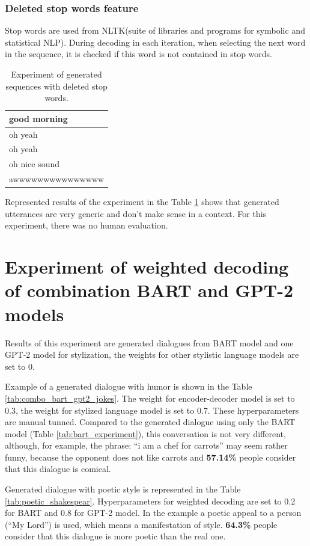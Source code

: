 \subsubsection{Deleted stop words feature}
Stop words are used from NLTK\protect\footnotemark (suite of libraries and programs for symbolic and statistical NLP). During decoding in each iteration, when selecting the next word in the sequence, it is checked if this word is not contained in stop words.

\begin{table}[ht]
\centering
 \begin{tabular}{|p{14cm}|} 
 \hline\hline
  good morning \\
 \hline
  oh yeah \\
 \hline
  oh yeah \\
 \hline
  oh nice sound \\
 \hline 
  awwwwwwwwwwwwwww \\
 \hline\hline
 \end{tabular}
 \caption{Experiment of generated sequences with deleted stop words.}
\label{tab:stop_words}
\end{table}
Represented results of the experiment in the Table \ref{tab:stop_words} shows that generated utterances are very generic and don't make sense in a context. For this experiment, there was no human evaluation.

\section{Experiment of weighted decoding of combination BART and GPT-2 models}
Results of this experiment are generated dialogues from BART model and one GPT-2 model for stylization, the weights for other stylistic language models are set to 0.

Example of a generated dialogue with humor is shown in the Table \ref{tab:combo_bart_gpt2_jokes}. The weight for encoder-decoder model is set to 0.3, the weight for stylized language model is set to 0.7. These hyperparameters are manual tunned. Compared to the generated dialogue using only the BART model (Table \ref{tab:bart_experiment}), this conversation is not very different, although, for example, the phrase: ``i am a chef for carrots'' may seem rather funny, because the opponent does not like carrots and \textbf{57.14\%} people consider that this dialogue is comical.

Generated dialogue with poetic style is represented in the Table \ref{tab:poetic_shakespear}. Hyperparameters for weighted decoding are set to 0.2 for BART and 0.8 for GPT-2 model. In the example a poetic appeal to a person (``My Lord'') is used, which means a manifestation of style. \textbf{64.3\%} people consider that this dialogue is more poetic than the real one.

